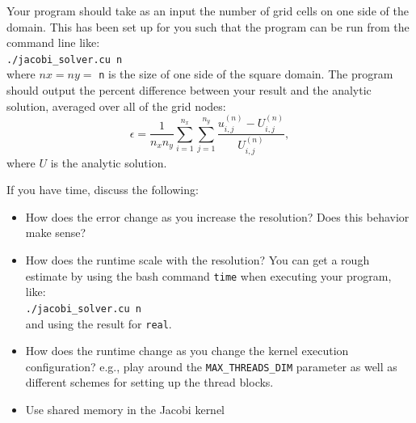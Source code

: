 \documentclass[11pt]{article}
\begin{document}
    Your program should take as an input the number of grid cells on one side of the domain.
    This has been set up for you such that the program can be run from the command line like: 
    \vspace{3mm}\\ \texttt{./jacobi\_solver.cu n} \vspace{3mm}\\
    where \(nx = ny = \) \texttt{n} is the size of one side of the square domain.
    The program should output the percent difference between your result and the analytic solution, averaged over all of the grid nodes:
    \begin{equation}
      \epsilon = \frac{1}{n_x n_y} \sum_{i=1}^{n_x} \sum_{j=1}^{n_y} \frac{u_{i,j}^{\left(n\right)} -
U_{i,j}^{\left(n\right)}}{U_{i,j}^{\left(n\right)}},
    \end{equation}
    where \(U\) is the analytic solution.
    
    If you have time, discuss the following:
    \begin{itemize}
      \item How does the error change as you increase the resolution? Does this behavior make sense?
      \item How does the runtime scale with the resolution? You can get a rough estimate by using the bash command \texttt{time} when executing your program, like:
    \vspace{3mm}\\ \texttt{./jacobi\_solver.cu n} \vspace{3mm}\\ and using the result for \texttt{real}. \\
      \item How does the runtime change as you change the kernel execution configuration?
        e.g., play around the \texttt{MAX\_THREADS\_DIM} parameter as well as different schemes for setting up the thread blocks.
      \item Use shared memory in the Jacobi kernel
    \end{itemize}
\end{document}
